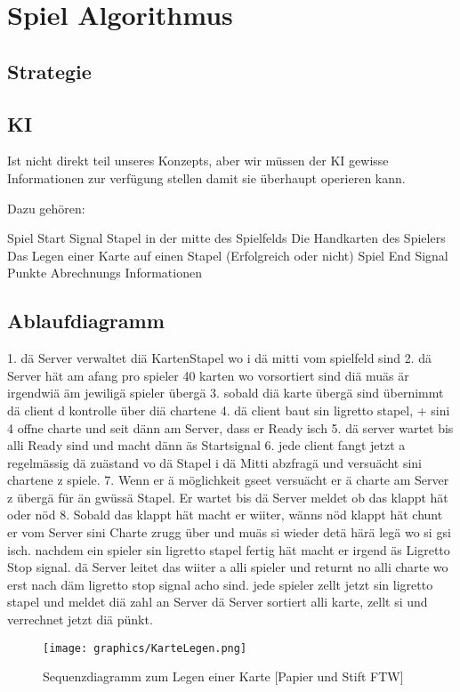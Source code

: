 \section{Spiel Algorithmus} 

\subsection{Strategie}

\subsection{KI}

Ist nicht direkt teil unseres Konzepts, aber wir müssen der KI gewisse Informationen zur verfügung stellen damit sie überhaupt operieren kann.

Dazu gehören:

Spiel Start Signal
Stapel in der mitte des Spielfelds
Die Handkarten des Spielers
Das Legen einer Karte auf einen Stapel (Erfolgreich oder nicht)
Spiel End Signal
Punkte Abrechnungs Informationen

\subsection{Ablaufdiagramm}

1. dä Server verwaltet diä KartenStapel wo i dä mitti vom spielfeld sind
			2. dä Server hät am afang pro spieler 40 karten wo vorsortiert sind diä muäs är irgendwiä äm jewiligä spieler übergä
			3. sobald diä karte übergä sind übernimmt dä client d kontrolle über diä chartene
			4. dä client baut sin ligretto stapel, + sini 4 offne charte und seit dänn am Server, dass er Ready isch
			5. dä server wartet bis alli Ready sind und macht dänn äs Startsignal
			6. jede client fangt jetzt a regelmässig dä zuästand vo dä Stapel i dä Mitti abzfragä und versuächt sini chartene z spiele.
			7. Wenn er ä möglichkeit gseet versuächt er ä charte am Server z übergä für än gwüssä Stapel. Er wartet bis dä Server meldet ob das klappt hät oder nöd
			8. Sobald das klappt hät macht er wiiter, wänns nöd klappt hät chunt er vom Server sini Charte zrugg über und muäs si wieder detä härä legä wo si gsi isch.
			nachdem ein spieler sin ligretto stapel fertig hät macht er irgend äs Ligretto Stop signal. dä Server leitet das wiiter a alli spieler und returnt no alli charte wo erst nach däm ligretto stop signal acho sind.
			jede spieler zellt jetzt sin ligretto stapel und meldet diä zahl an Server
			dä Server sortiert alli karte, zellt si und verrechnet jetzt diä pünkt.
			
\begin{figure}[hbt]
  \centering
  \texttt{[image: graphics/KarteLegen.png]}
  \caption{Sequenzdiagramm zum Legen einer Karte [Papier und Stift FTW] \hfill{} }
 \end{figure}
